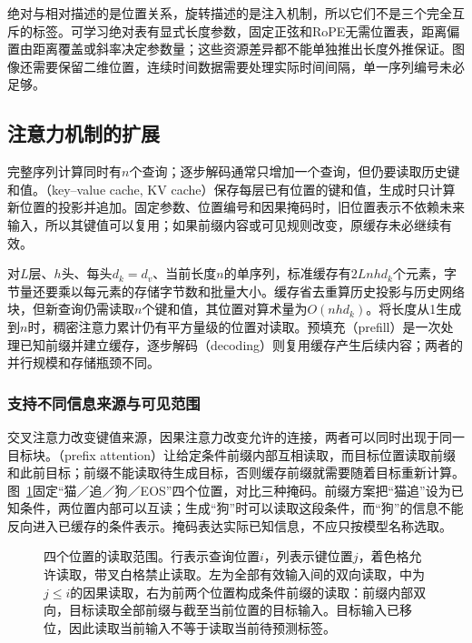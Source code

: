 绝对与相对描述的是位置关系，旋转描述的是注入机制，所以它们不是三个完全互斥的标签。可学习绝对表有显式长度参数，固定正弦和RoPE无需位置表，距离偏置由距离覆盖或斜率决定参数量；这些资源差异都不能单独推出长度外推保证。图像还需要保留二维位置，连续时间数据需要处理实际时间间隔，单一序列编号未必足够。



\subsection{注意力机制的扩展}
\label{sec:transformer-attention-extensions}

完整序列计算同时有$n$个查询；逐步解码通常只增加一个查询，但仍要读取历史键和值。（key--value cache, KV cache）保存每层已有位置的键和值，生成时只计算新位置的投影并追加。固定参数、位置编号和因果掩码时，旧位置表示不依赖未来输入，所以其键值可以复用；如果前缀内容或可见规则改变，原缓存未必继续有效。

对$L$层、$h$头、每头$d_k=d_v$、当前长度$n$的单序列，标准缓存有$2Lnhd_k$个元素，字节量还要乘以每元素的存储字节数和批量大小。缓存省去重算历史投影与历史网络块，但新查询仍需读取$n$个键和值，其位置对算术量为$O(nhd_k)$。将长度从1生成到$n$时，稠密注意力累计仍有平方量级的位置对读取。预填充（prefill）是一次处理已知前缀并建立缓存，逐步解码（decoding）则复用缓存产生后续内容；两者的并行规模和存储瓶颈不同。

\subsubsection{支持不同信息来源与可见范围}

交叉注意力改变键值来源，因果注意力改变允许的连接，两者可以同时出现于同一目标块。（prefix attention）让给定条件前缀内部互相读取，而目标位置读取前缀和此前目标；前缀不能读取待生成目标，否则缓存前缀就需要随着目标重新计算。图~\ref{fig:transformer-masks}固定“猫／追／狗／EOS”四个位置，对比三种掩码。前缀方案把“猫追”设为已知条件，两位置内部可以互读；生成“狗”时可以读取这段条件，而“狗”的信息不能反向进入已缓存的条件表示。掩码表达实际已知信息，不应只按模型名称选取。

\begin{figure}[htbp]
  \centering
  
  \caption{四个位置的读取范围。行表示查询位置$i$，列表示键位置$j$，着色格允许读取，带叉白格禁止读取。左为全部有效输入间的双向读取，中为$j\leq i$的因果读取，右为前两个位置构成条件前缀的读取：前缀内部双向，目标读取全部前缀与截至当前位置的目标输入。目标输入已移位，因此读取当前输入不等于读取当前待预测标签。}
  \label{fig:transformer-masks}
\end{figure}
\FloatBarrier


